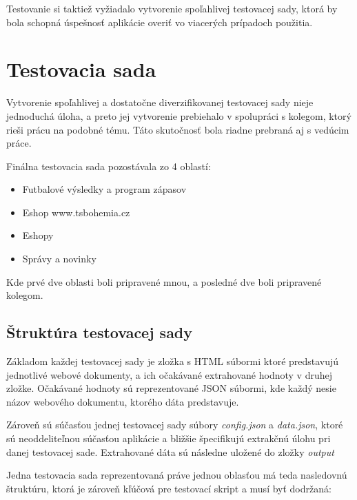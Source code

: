 Testovanie si taktiež vyžiadalo vytvorenie spoľahlivej testovacej sady, ktorá by bola schopná úspešnosť aplikácie overiť vo viacerých prípadoch použitia. 

\newpage
\section{Testovacia sada}

Vytvorenie spoľahlivej a dostatočne diverzifikovanej testovacej sady nieje jednoduchá úloha, a preto jej vytvorenie prebiehalo v spolupráci s kolegom, ktorý rieši prácu na podobné tému. Táto skutočnosť bola riadne prebraná aj s vedúcim práce.

Finálna testovacia sada pozostávala zo 4 oblastí:

\begin{itemize}
    \item Futbalové výsledky a program zápasov
    \item Eshop www.tsbohemia.cz
    \item Eshopy
    \item Správy a novinky
\end{itemize}

Kde prvé dve oblasti boli pripravené mnou, a posledné dve boli pripravené kolegom.

\subsection{Štruktúra testovacej sady}

Základom každej testovacej sady je zložka s HTML súbormi ktoré predstavujú jednotlivé webové dokumenty, a ich očakávané extrahované hodnoty v druhej zložke. Očakávané hodnoty sú reprezentované JSON súbormi, kde každý nesie názov webového dokumentu, ktorého dáta predstavuje. 

Zároveň sú súčasťou jednej testovacej sady súbory \textit{config.json} a \textit{data.json}, ktoré sú neoddeliteľnou súčasťou aplikácie a bližšie špecifikujú extrakčnú úlohu pri danej testovacej sade. Extrahované dáta sú následne uložené do zložky \textit{output}

Jedna testovacia sada reprezentovaná práve jednou oblasťou má teda nasledovnú štruktúru, ktorá je zároveň kľúčová pre testovací skript a musí byť dodržaná:

